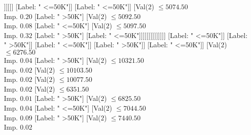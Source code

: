 \documentclass[margin=10pt]{standalone}
\begin{document}
\begin{forest}
																																										[Val($2$) $ \leq 3875.50$ \\ Imp. $0.02$
																																											[Label: " <=50K"]
																																											[Val($2$) $ \leq 4107.50$ \\ Imp. $0.17$
																																												[Label: " <=50K"]
																																												[Val($2$) $ \leq 4171.50$ \\ Imp. $0.32$
																																													[Label: " >50K"]
																																													[Label: " <=50K"]]]]]]
																																								[Label: " <=50K"]]
																																							[Label: " <=50K"]]
																																						[Val($2$) $ \leq 5074.50$ \\ Imp. $0.20$
																																							[Label: " >50K"]
																																							[Val($2$) $ \leq 5092.50$ \\ Imp. $0.08$
																																								[Label: " <=50K"]
																																								[Val($2$) $ \leq 5097.50$ \\ Imp. $0.32$
																																									[Label: " >50K"]
																																									[Label: " <=50K"]]]]]]]]]]]]]]
																												[Label: " <=50K"]]
																											[Label: " >50K"]]
																										[Label: " <=50K"]]
																									[Label: " >50K"]]
																								[Label: " <=50K"]]
																							[Val($2$) $ \leq 6276.50$ \\ Imp. $0.04$
																								[Label: " >50K"]
																								[Val($2$) $ \leq 10321.50$ \\ Imp. $0.02$
																									[Val($2$) $ \leq 10103.50$ \\ Imp. $0.02$
																										[Val($2$) $ \leq 10077.50$ \\ Imp. $0.02$
																											[Val($2$) $ \leq 6351.50$ \\ Imp. $0.01$
																												[Label: " >50K"]
																												[Val($2$) $ \leq 6825.50$ \\ Imp. $0.04$
																													[Label: " <=50K"]
																													[Val($2$) $ \leq 7044.50$ \\ Imp. $0.09$
																														[Label: " >50K"]
																														[Val($2$) $ \leq 7440.50$ \\ Imp. $0.02$

\end{forest}
\end{document}
